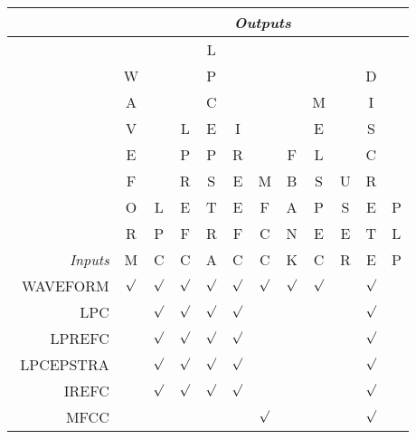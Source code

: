\begin{center}


\begin{tabular}{|r||ccccccccccc|} \cline{2-12}


 \multicolumn{1}{c}{} & \multicolumn{11}{|c|}{\it Outputs } \\


\cline{2-11} \cline{2-11} \hline


          ~ & ~ & ~ & ~ & L  & ~ & ~ & ~ & ~ & ~ & ~ & ~ \\ 


          ~ & W & ~ & ~ & P  & ~ & ~ & ~ & ~ & ~ & D & ~ \\ 


          ~ & A & ~ & ~ & C  & ~ & ~ & ~ & M & ~ & I & ~ \\ 


          ~ & V & ~ & L & E  & I & ~ & ~ & E & ~ & S & ~ \\ 


          ~ & E & ~ & P & P  & R & ~ & F & L & ~ & C & ~ \\ 


          ~ & F & ~ & R & S  & E & M & B & S & U & R & ~ \\ 


          ~ & O & L & E & T  & E & F & A & P & S & E & P \\ 


          ~ & R & P & F & R  & F & C & N & E & E & T  & L \\ 


{\it Inputs} & M & C & C & A  & C & C & K & C & R & E & P \\ \hline 


~WAVEFORM & $\surd$ & $\surd$ & $\surd$ & $\surd$  &$\surd$& $\surd$ & $\surd$ & $\surd$ & ~ &$\surd$ & ~\\ 


~~~~~~LPC & ~ & $\surd$ & $\surd$ & $\surd$  &$\surd$& ~ & ~ & ~ & ~ &$\surd$ & ~\\ 


~~~LPREFC & ~ & $\surd$ & $\surd$ & $\surd$  &$\surd$& ~ & ~ & ~ & ~ &$\surd$& ~\\


LPCEPSTRA & ~ & $\surd$ & $\surd$ & $\surd$  &$\surd$& ~ & ~ & ~ & ~ &$\surd$& ~\\


~~~~IREFC & ~ & $\surd$ & $\surd$ & $\surd$  &$\surd$& ~ & ~ & ~ & ~ &$\surd$& ~\\


~~~~~MFCC & ~ & ~ & ~ &  ~ & ~ & $\surd$ & ~ & ~ & ~ &$\surd$& ~\\ 



\end{tabular}
\end{center}
